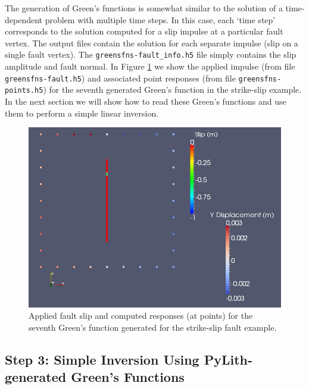 The generation of Green's functions is somewhat similar to the solution
of a time-dependent problem with multiple time steps. In this case,
each `time step' corresponds to the solution computed for a slip impulse
at a particular fault vertex. The output files contain the solution
for each separate impulse (slip on a single fault vertex). The \texttt{greensfns-fault\_info.h5}
file simply contains the slip amplitude and fault normal. In Figure
\ref{fig:greensfns2d-strikeslip-gf6} we show the applied impulse
(from file \texttt{greensfns-fault.h5}) and associated point responses
(from file \texttt{greensfns-points.h5}) for the seventh generated
Green's function in the strike-slip example. In the next section we
will show how to read these Green's functions and use them to perform
a simple linear inversion.

\noindent \begin{center}
\begin{figure}
\begin{centering}
\includegraphics[scale=0.33]{tutorials/greensfns2d/figs/strikeslip_gf6}
\par\end{centering}

\caption{Applied fault slip and computed responses (at points) for the seventh
Green's function generated for the strike-slip fault example.\label{fig:greensfns2d-strikeslip-gf6}}
\end{figure}

\par\end{center}


\subsection{Step 3: Simple Inversion Using PyLith-generated Green's Functions}

